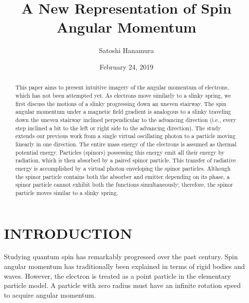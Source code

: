 \documentclass[reprint,amsmath,amssymb,aps,draft]{revtex4-1}
\numberwithin{equation}{section}%
\begin{document}


    \title{A New Representation of Spin Angular Momentum}
    \author{Satoshi Hanamura}
    \date{February 24, 2019}
        \begin{abstract}
        This paper aims to present intuitive imagery of the angular momentum of electrons, which has not been attempted yet. As electrons move similarly to a slinky spring, we first discuss the motions of a slinky progressing down an uneven stairway. The spin angular momentum under a magnetic field gradient is analogous to a slinky traveling down the uneven stairway inclined perpendicular to the advancing direction (i.e., every step inclined a bit to the left or right side to the advancing direction). The study extends our previous work from a single virtual oscillating photon to a particle moving linearly in one direction. The entire mass energy of the electrons is assumed as thermal potential energy. Particles (spinors) possessing this energy emit all their energy by radiation, which is then absorbed by a paired spinor particle. This transfer of radiative energy is accomplished by a virtual photon enveloping the spinor particles. Although the spinor particle contains both the absorber and emitter depending on its phase, a spinor particle cannot exhibit both the functions simultaneously; therefore, the spinor particle moves similar to a slinky spring.

        \end{abstract}
    \maketitle

\section{\label{sec:INTRODUCTION}INTRODUCTION}

    Studying quantum spin has remarkably progressed over the past century. Spin angular momentum has traditionally been explained in terms of rigid bodies and waves. However, the electron is treated as a point particle in the elementary particle model. A particle with zero radius must have an infinite rotation speed to acquire angular momentum.
    
\end{document}
